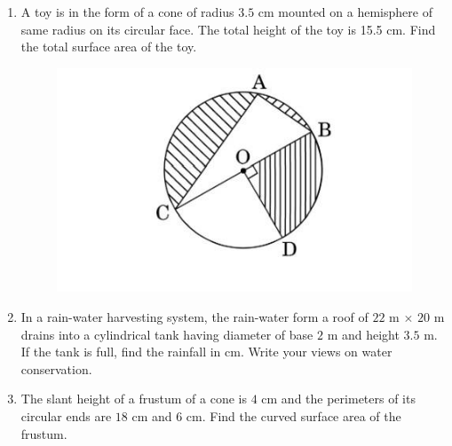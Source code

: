 \begin{enumerate}
\begin{figure}[H]
\end{figure}
\item A toy is in the form of a cone of radius $3.5$ cm mounted on a hemisphere of same radius on its circular face. The total height of the toy is 15.5 cm. Find the total surface area of the toy.
\begin{figure}[H]
\centering
\includegraphics[width=0.5\linewidth]{figs/geo6.jpg}
\label{fig:enter-label}
\end{figure}
\item In a rain-water harvesting system, the rain-water form a roof of $22$ m $\times$ $20$ m drains into a cylindrical tank having diameter of base $2$ m and height $3.5$ m. If the tank is full, find the rainfall in cm. Write your views on water conservation.
\item The slant height of a frustum of a cone is $4$ cm and the perimeters of its circular ends are $18$ cm and $6$ cm. Find the curved surface area of the frustum.
\end{enumerate}
